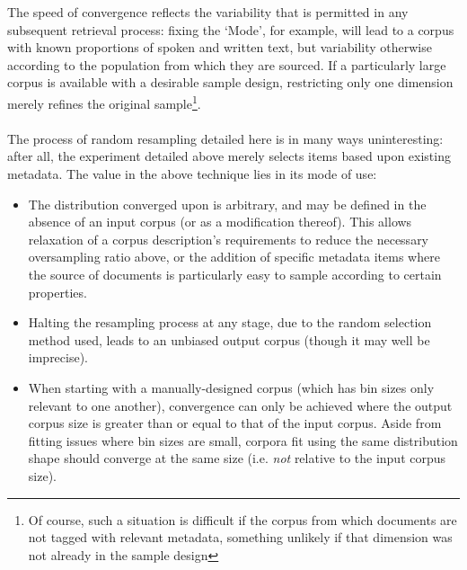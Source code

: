 The speed of convergence reflects the variability that is permitted in any subsequent retrieval process: fixing the `Mode', for example, will lead to a corpus with known proportions of spoken and written text, but variability otherwise according to the population from which they are sourced.  If a particularly large corpus is available with a desirable sample design, restricting only one dimension merely refines the original sample\footnote{Of course, such a situation is difficult if the corpus from which documents are not tagged with relevant metadata, something unlikely if that dimension was not already in the sample design}.

\paragraph{}

The process of random resampling detailed here is in many ways uninteresting: after all, the experiment detailed above merely selects items based upon existing metadata.  The value in the above technique lies in its mode of use:

\begin{itemize}
    \item The distribution converged upon is arbitrary, and may be defined in the absence of an input corpus (or as a modification thereof).  This allows relaxation of a corpus description's requirements to reduce the necessary oversampling ratio above, or the addition of specific metadata items where the source of documents is particularly easy to sample according to certain properties.
    \item Halting the resampling process at any stage, due to the random selection method used, leads to an unbiased output corpus (though it may well be imprecise).
    \item When starting with a manually-designed corpus (which has bin sizes only relevant to one another), convergence can only be achieved where the output corpus size is greater than or equal to that of the input corpus.  Aside from fitting issues where bin sizes are small, corpora fit using the same distribution shape should converge at the same size (i.e. \textsl{not} relative to the input corpus size).

\end{itemize}


